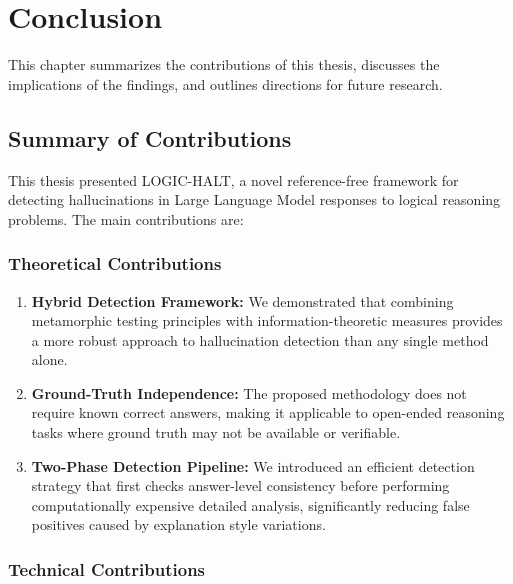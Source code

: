 \chapter{Conclusion}

This chapter summarizes the contributions of this thesis, discusses the implications of the findings, and outlines directions for future research.

\section{Summary of Contributions}

This thesis presented LOGIC-HALT, a novel reference-free framework for detecting hallucinations in Large Language Model responses to logical reasoning problems. The main contributions are:

\subsection{Theoretical Contributions}

\begin{enumerate}
    \item \textbf{Hybrid Detection Framework:} We demonstrated that combining metamorphic testing principles with information-theoretic measures provides a more robust approach to hallucination detection than any single method alone.

    \item \textbf{Ground-Truth Independence:} The proposed methodology does not require known correct answers, making it applicable to open-ended reasoning tasks where ground truth may not be available or verifiable.

    \item \textbf{Two-Phase Detection Pipeline:} We introduced an efficient detection strategy that first checks answer-level consistency before performing computationally expensive detailed analysis, significantly reducing false positives caused by explanation style variations.
\end{enumerate}

\subsection{Technical Contributions}

